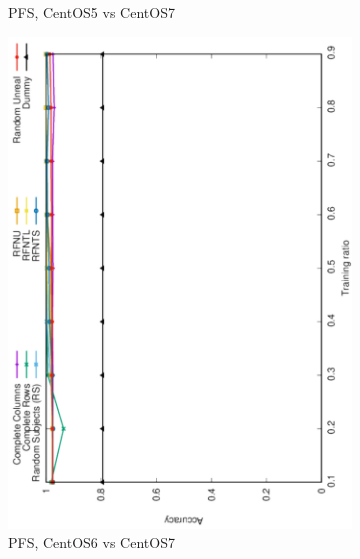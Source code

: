 \documentclass[10pt, conference, compsocconf]{IEEEtran}
\begin{document}
\begin{figure}
\begin{subfigure}[b]{0.4\linewidth}
        \caption{PFS, CentOS5 vs CentOS7}
\end{subfigure}
\begin{subfigure}[b]{0.4\linewidth}
        \includegraphics[width=0.8\columnwidth, angle=-90]{data/results/means_of_results/ALS-Bias/PreFreeSurfer/ALS-Bias-PFS-6v7.pdf}
        \caption{PFS, CentOS6 vs CentOS7}
\end{subfigure}\hfill
\begin{subfigure}[b]{0.4\linewidth}

\end{subfigure}
\end{figure}
\end{document}
